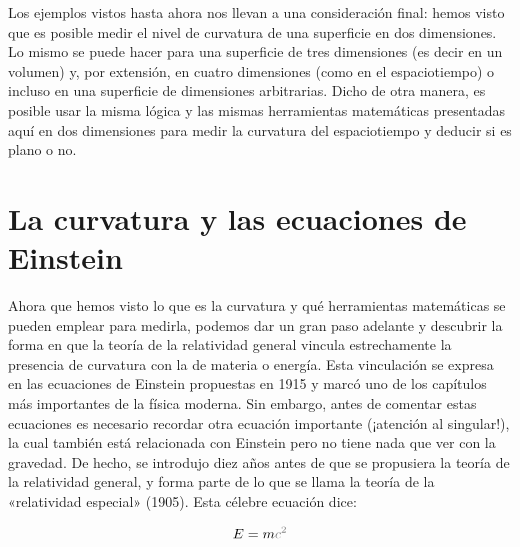 Los ejemplos vistos hasta ahora nos llevan a una consideración final: hemos visto que es
posible medir el nivel de curvatura de una superficie en dos dimensiones. Lo mismo se puede
hacer para una superficie de tres dimensiones (es decir en un volumen) y, por extensión, en
cuatro dimensiones (como en el espaciotiempo) o incluso en una superficie de dimensiones
arbitrarias. Dicho de otra manera, es posible usar la misma lógica y las mismas herramientas
matemáticas presentadas aquí en dos dimensiones para medir la curvatura del espaciotiempo y
deducir si es plano o no.

\section{La curvatura y las ecuaciones de Einstein}\label{sec:03-equations}

Ahora que hemos visto lo que es la curvatura y qué herramientas matemáticas se pueden emplear
para medirla, podemos dar un gran paso adelante y descubrir la forma en que la teoría de la
relatividad general vincula estrechamente la presencia de curvatura con la de materia o
energía. Esta vinculación se expresa en las ecuaciones de Einstein propuestas en 1915 y marcó
uno de los capítulos más importantes de la física moderna. Sin embargo, antes de comentar estas
ecuaciones es necesario recordar otra ecuación importante (¡atención al singular!), la cual
también está relacionada con Einstein pero no tiene nada que ver con la gravedad. De hecho, se
introdujo diez años antes de que se propusiera la teoría de la relatividad general, y forma
parte de lo que se llama la teoría de la «relatividad especial» (1905). Esta célebre ecuación
dice:

\begin{equation}\label{eq:03-02}
E = m\textcolor{gray}{c^{2}}
\end{equation}


